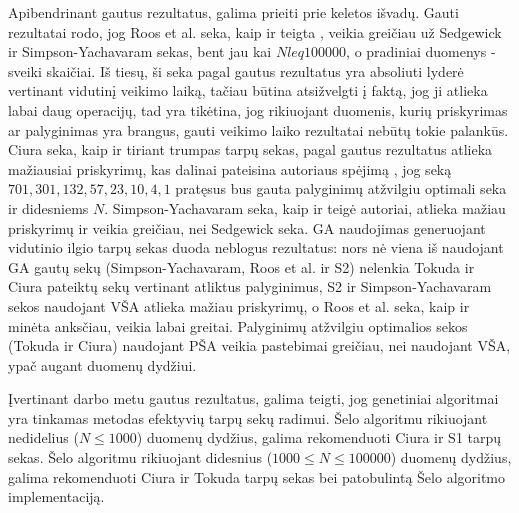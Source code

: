 \documentclass{VUMIFInfKursinis}
\begin{document}
Apibendrinant gautus rezultatus, galima prieiti prie keletos išvadų. %
Gauti rezultatai rodo, jog Roos et al. seka, kaip ir teigta \cite{roos2002genetic},
veikia greičiau už Sedgewick ir Simpson-Yachavaram sekas, bent jau kai $N leq 100000$, o pradiniai duomenys - sveiki skaičiai.
Iš tiesų, ši seka pagal gautus rezultatus yra absoliuti lyderė vertinant vidutinį veikimo laiką, tačiau būtina atsižvelgti į faktą, jog ji atlieka labai daug operacijų,
tad yra tikėtina, jog rikiuojant duomenis, kurių priskyrimas ar palyginimas yra brangus, gauti veikimo laiko rezultatai nebūtų tokie palankūs.
Ciura seka, kaip ir tiriant trumpas tarpų sekas, pagal gautus rezultatus atlieka mažiausiai priskyrimų, kas dalinai pateisina autoriaus spėjimą \cite{ciura2001best},
jog seką $701,301,132,57,23,10,4,1$ pratęsus bus gauta palyginimų atžvilgiu optimali seka ir didesniems $N$.
Simpson-Yachavaram seka, kaip ir teigė \cite{simpson1999faster} autoriai, atlieka mažiau priskyrimų ir veikia greičiau, nei Sedgewick seka.
GA naudojimas generuojant vidutinio ilgio tarpų sekas duoda neblogus rezultatus: nors nė viena iš naudojant GA gautų sekų (Simpson-Yachavaram, Roos et al. ir S2) nelenkia Tokuda ir Ciura pateiktų sekų
vertinant atliktus palyginimus, S2 ir Simpson-Yachavaram sekos naudojant VŠA atlieka mažiau priskyrimų, o Roos et al. seka, kaip ir minėta anksčiau, veikia labai greitai. 
Palyginimų atžvilgiu optimalios sekos (Tokuda ir Ciura) naudojant PŠA veikia pastebimai greičiau, nei naudojant VŠA, ypač augant duomenų dydžiui.


Įvertinant darbo metu gautus rezultatus, galima teigti, jog genetiniai algoritmai yra tinkamas metodas efektyvių tarpų sekų radimui.
Šelo algoritmu rikiuojant nedidelius ($N \leq 1000$) duomenų dydžius, galima rekomenduoti Ciura ir S1 tarpų sekas.
Šelo algoritmu rikiuojant didesnius ($1000 \leq N \leq 100000$) duomenų dydžius, galima rekomenduoti Ciura ir Tokuda tarpų sekas bei patobulintą Šelo algoritmo implementaciją.



\printbibliography[heading=bibintoc] %

\appendix  %
\end{document}
